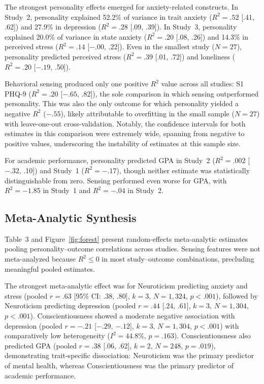 \documentclass[12pt, a4paper]{article}
\begin{document}
The strongest personality effects emerged for anxiety-related constructs. In Study~2, personality explained 52.2\% of variance in trait anxiety ($R^2 = .52$ [.41, .62]) and 27.9\% in depression ($R^2 = .28$ [.09, .39]). In Study~3, personality explained 20.0\% of variance in state anxiety ($R^2 = .20$ [.08, .26]) and 14.3\% in perceived stress ($R^2 = .14$ [${-.00}$, .22]). Even in the smallest study ($N = 27$), personality predicted perceived stress ($R^2 = .39$ [.01, .72]) and loneliness ($R^2 = .20$ [${-.19}$, .50]).

Behavioral sensing produced only one positive $R^2$ value across all studies: S1 PHQ-9 ($R^2 = .20$ [${-.65}$, .82]), the sole comparison in which sensing outperformed personality. This was also the only outcome for which personality yielded a negative $R^2$ ($-.55$), likely attributable to overfitting in the small sample ($N = 27$) with leave-one-out cross-validation. Notably, the confidence intervals for both estimates in this comparison were extremely wide, spanning from negative to positive values, underscoring the instability of estimates at this sample size.

For academic performance, personality predicted GPA in Study~2 ($R^2 = .002$ [${-.32}$, .10]) and Study~1 ($R^2 = -.17$), though neither estimate was statistically distinguishable from zero. Sensing performed even worse for GPA, with $R^2 = -1.85$ in Study~1 and $R^2 = -.04$ in Study~2.

\subsection{Meta-Analytic Synthesis}

Table~3 and Figure~\ref{fig:forest} present random-effects meta-analytic estimates pooling personality--outcome correlations across studies. Sensing features were not meta-analyzed because $R^2 \leq 0$ in most study--outcome combinations, precluding meaningful pooled estimates.

The strongest meta-analytic effect was for Neuroticism predicting anxiety and stress (pooled $r = .63$ [95\% CI: .38, .80], $k = 3$, $N = 1{,}324$, $p < .001$), followed by Neuroticism predicting depression (pooled $r = .44$ [.24, .61], $k = 3$, $N = 1{,}304$, $p < .001$). Conscientiousness showed a moderate negative association with depression (pooled $r = -.21$ [${-.29}$, ${-.12}$], $k = 3$, $N = 1{,}304$, $p < .001$) with comparatively low heterogeneity ($I^2 = 44.8\%$, $p = .163$). Conscientiousness also predicted GPA (pooled $r = .38$ [.06, .62], $k = 2$, $N = 248$, $p = .019$), demonstrating trait-specific dissociation: Neuroticism was the primary predictor of mental health, whereas Conscientiousness was the primary predictor of academic performance.
\end{document}
